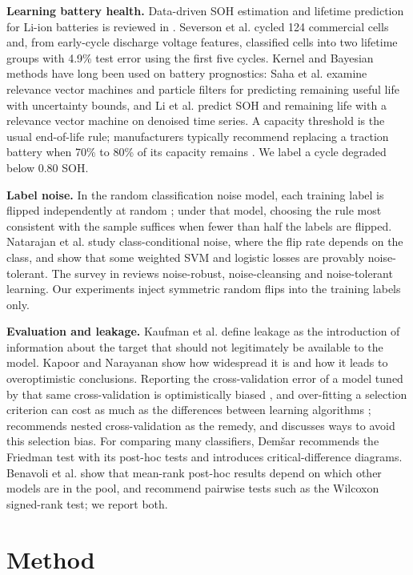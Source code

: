 \documentclass[conference,a4paper]{IEEEtran}
\begin{document}
\textbf{Learning battery health.} Data-driven SOH estimation and lifetime prediction for Li-ion batteries is reviewed in \cite{r22}. Severson et al. \cite{r23} cycled 124 commercial cells and, from early-cycle discharge voltage features, classified cells into two lifetime groups with 4.9\% test error using the first five cycles. Kernel and Bayesian methods have long been used on battery prognostics: Saha et al. \cite{r11} examine relevance vector machines and particle filters for predicting remaining useful life with uncertainty bounds, and Li et al. \cite{r18} predict SOH and remaining life with a relevance vector machine on denoised time series. A capacity threshold is the usual end-of-life rule; manufacturers typically recommend replacing a traction battery when 70\% to 80\% of its capacity remains \cite{r14}. We label a cycle degraded below 0.80 SOH.

\textbf{Label noise.} In the random classification noise model, each training label is flipped independently at random \cite{r3}; under that model, choosing the rule most consistent with the sample suffices when fewer than half the labels are flipped. Natarajan et al. \cite{r16} study class-conditional noise, where the flip rate depends on the class, and show that some weighted SVM and logistic losses are provably noise-tolerant. The survey in \cite{r17} reviews noise-robust, noise-cleansing and noise-tolerant learning. Our experiments inject symmetric random flips into the training labels only.

\textbf{Evaluation and leakage.} Kaufman et al. \cite{r15} define leakage as the introduction of information about the target that should not legitimately be available to the model. Kapoor and Narayanan \cite{r26} show how widespread it is and how it leads to overoptimistic conclusions. Reporting the cross-validation error of a model tuned by that same cross-validation is optimistically biased \cite{r8}, and over-fitting a selection criterion can cost as much as the differences between learning algorithms \cite{r12}; \cite{r8} recommends nested cross-validation as the remedy, and \cite{r12} discusses ways to avoid this selection bias. For comparing many classifiers, Dem\v{s}ar \cite{r7} recommends the Friedman test with its post-hoc tests and introduces critical-difference diagrams. Benavoli et al. \cite{r19} show that mean-rank post-hoc results depend on which other models are in the pool, and recommend pairwise tests such as the Wilcoxon signed-rank test; we report both.

\section{Method}
\end{document}
